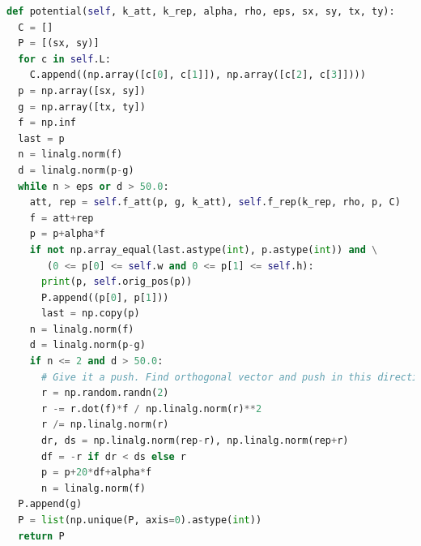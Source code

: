 \documentclass[12pt]{article}
\theoremstyle{plain}
\numberwithin{equation}{section}
\begin{document}
\begin{lstlisting}[language=Python]
def potential(self, k_att, k_rep, alpha, rho, eps, sx, sy, tx, ty):
  C = []
  P = [(sx, sy)]
  for c in self.L:
    C.append((np.array([c[0], c[1]]), np.array([c[2], c[3]])))
  p = np.array([sx, sy])
  g = np.array([tx, ty])
  f = np.inf
  last = p
  n = linalg.norm(f)
  d = linalg.norm(p-g)
  while n > eps or d > 50.0:
    att, rep = self.f_att(p, g, k_att), self.f_rep(k_rep, rho, p, C)
    f = att+rep
    p = p+alpha*f
    if not np.array_equal(last.astype(int), p.astype(int)) and \
       (0 <= p[0] <= self.w and 0 <= p[1] <= self.h):
      print(p, self.orig_pos(p))
      P.append((p[0], p[1]))
      last = np.copy(p)
    n = linalg.norm(f)
    d = linalg.norm(p-g)
    if n <= 2 and d > 50.0:
      # Give it a push. Find orthogonal vector and push in this direction.
      r = np.random.randn(2)
      r -= r.dot(f)*f / np.linalg.norm(r)**2
      r /= np.linalg.norm(r)
      dr, ds = np.linalg.norm(rep-r), np.linalg.norm(rep+r)
      df = -r if dr < ds else r
      p = p+20*df+alpha*f
      n = linalg.norm(f)
  P.append(g)
  P = list(np.unique(P, axis=0).astype(int))
  return P
\end{lstlisting}
\end{document}
